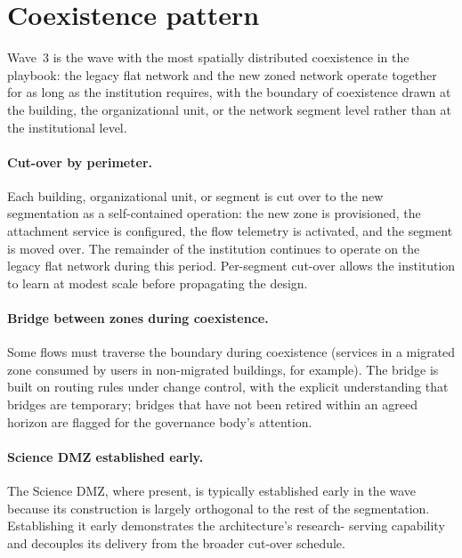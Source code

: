 \section{Coexistence pattern}
\label{sec:w3-coexistence}

Wave~3 is the wave with the most spatially distributed coexistence
in the playbook: the legacy flat network and the new zoned network
operate together for as long as the institution requires, with the
boundary of coexistence drawn at the building, the organizational
unit, or the network segment level rather than at the institutional
level.

\paragraph{Cut-over by perimeter.} Each building, organizational
unit, or segment is cut over to the new segmentation as a
self-contained
operation: the new zone is provisioned, the attachment service is
configured, the flow telemetry is activated, and the segment is
moved over. The remainder of the institution continues to operate
on the legacy flat network during this period. Per-segment cut-over
allows the institution to learn at modest scale before propagating
the design.

\paragraph{Bridge between zones during coexistence.} Some flows
must traverse the boundary during coexistence (services in a
migrated zone consumed by users in non-migrated buildings, for
example). The bridge is built on routing rules under change
control, with the explicit understanding that bridges are
temporary; bridges that have not been retired within an agreed
horizon are flagged for the governance body's attention.

\paragraph{Science DMZ established early.} The Science DMZ, where
present, is typically established early in the wave because its
construction is largely orthogonal to the rest of the segmentation.
Establishing it early demonstrates the architecture's research-
serving capability and decouples its delivery from the broader
cut-over schedule.

